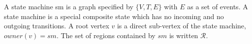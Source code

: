 \begin{definition} A state machine sm is a graph specified by $\{V, T, E\}$ with $E$ as a set of events. 
	A state machine is a special composite state which has no incoming and no outgoing transitions. 
	A root vertex $v$ is a direct sub-vertex of the state machine, $owner(v) = sm$. The set of regions contained by $sm$ is written $\mathcal{R}$.
\end{definition}	

